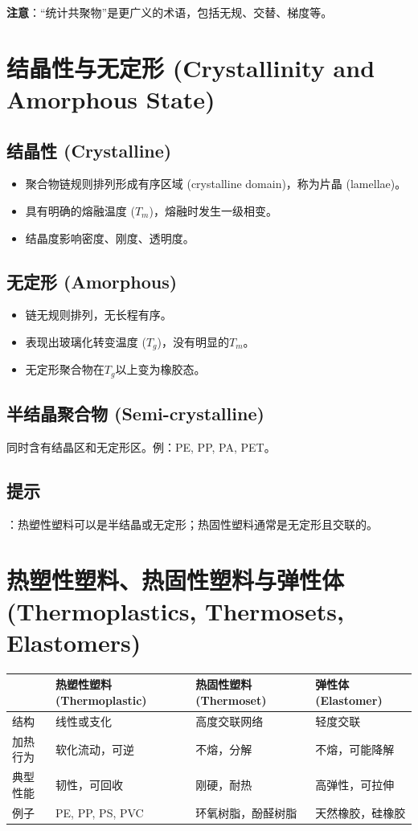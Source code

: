 \documentclass[12pt,a4paper]{ctexart}
\begin{document}
\textbf{注意}：“统计共聚物”是更广义的术语，包括无规、交替、梯度等。

\section{结晶性与无定形 (Crystallinity and Amorphous State)}

\subsection{结晶性 (Crystalline)}
\begin{itemize}
    \item 聚合物链规则排列形成有序区域 (crystalline domain)，称为片晶 (lamellae)。
    \item 具有明确的熔融温度 ($T_m$)，熔融时发生一级相变。
    \item 结晶度影响密度、刚度、透明度。
\end{itemize}

\subsection{无定形 (Amorphous)}
\begin{itemize}
    \item 链无规则排列，无长程有序。
    \item 表现出玻璃化转变温度 ($T_g$)，没有明显的$T_m$。
    \item 无定形聚合物在$T_g$以上变为橡胶态。
\end{itemize}

\subsection{半结晶聚合物 (Semi-crystalline)}
同时含有结晶区和无定形区。例：PE, PP, PA, PET。

\subsection{提示}：热塑性塑料可以是半结晶或无定形；热固性塑料通常是无定形且交联的。

\section{热塑性塑料、热固性塑料与弹性体 (Thermoplastics, Thermosets, Elastomers)}

\begin{longtable}{p{4cm}p{4cm}p{4cm}p{4cm}}
\toprule
 & \textbf{热塑性塑料 (Thermoplastic)} & \textbf{热固性塑料 (Thermoset)} & \textbf{弹性体 (Elastomer)} \\
\midrule
结构 & 线性或支化 & 高度交联网络 & 轻度交联 \\
加热行为 & 软化流动，可逆 & 不熔，分解 & 不熔，可能降解 \\
典型性能 & 韧性，可回收 & 刚硬，耐热 & 高弹性，可拉伸 \\
例子 & PE, PP, PS, PVC & 环氧树脂，酚醛树脂 & 天然橡胶，硅橡胶 \\
\bottomrule
\end{longtable}
\end{document}

